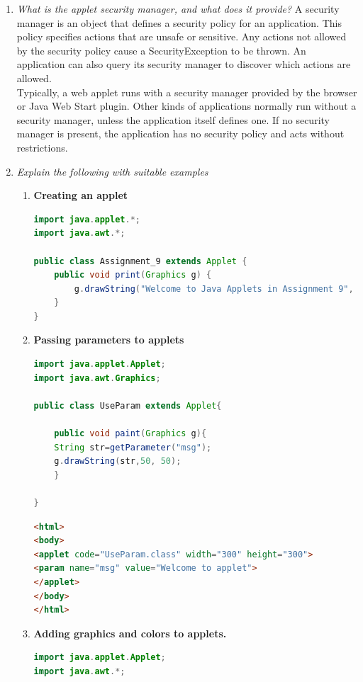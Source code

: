 \documentclass[11pt]{article}
\begin{document}
\begin{enumerate}
	\item \textit{What is the applet security manager, and what does it provide?}
	      A security manager is an object that defines a security policy for an application. This policy specifies actions that are unsafe or sensitive. Any actions not allowed by the security policy cause a SecurityException to be thrown. An application can also query its security manager to discover which actions are allowed.\\

	      Typically, a web applet runs with a security manager provided by the browser or Java Web Start plugin. Other kinds of applications normally run without a security manager, unless the application itself defines one. If no security manager is present, the application has no security policy and acts without restrictions.
	\item \textit{Explain the following with suitable examples}
	      \begin{enumerate}
		      \item \textbf{Creating an applet}
		            \begin{lstlisting}[language=Java]
import java.applet.*;
import java.awt.*;

public class Assignment_9 extends Applet {
    public void print(Graphics g) {
        g.drawString("Welcome to Java Applets in Assignment 9", 150, 150);
    }
}
			  \end{lstlisting}
		      \item \textbf{Passing parameters to applets}
		            \begin{lstlisting}[language=Java]
import java.applet.Applet;  
import java.awt.Graphics;  

public class UseParam extends Applet{  
  
	public void paint(Graphics g){  
	String str=getParameter("msg");  
	g.drawString(str,50, 50);  
	}  
	
}  
\end{lstlisting}
		            \begin{lstlisting}[language=html]
<html>  
<body>  
<applet code="UseParam.class" width="300" height="300">  
<param name="msg" value="Welcome to applet">  
</applet>  
</body>  
</html>  
\end{lstlisting}
		      \item \textbf{Adding graphics and colors to applets.}
		            \begin{lstlisting}[language=Java]
import java.applet.Applet;  
import java.awt.*;  


\end{lstlisting}
\end{enumerate}
\end{enumerate}
\end{document}
